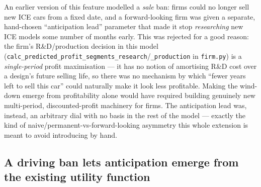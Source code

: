 \documentclass[11pt]{article}
\newcommand{\code}[1]{\texttt{#1}}
\begin{document}
An earlier version of this feature modelled a \emph{sale} ban: firms could
no longer sell new ICE cars from a fixed date, and a forward-looking firm
was given a separate, hand-chosen ``anticipation lead'' parameter that made
it stop \emph{researching} new ICE models some number of months early. This
was rejected for a good reason: the firm's R\&D/production decision in this
model (\code{calc\_predicted\_profit\_segments\_research}/\code{\_production}
in \code{firm.py}) is a \emph{single-period} profit maximisation --- it has
no notion of amortising R\&D cost over a design's future selling life, so
there was no mechanism by which ``fewer years left to sell this car'' could
naturally make it look less profitable. Making the wind-down emerge from
profitability alone would have required building genuinely new multi-period,
discounted-profit machinery for firms. The anticipation lead was, instead,
an arbitrary dial with no basis in the rest of the model --- exactly the
kind of naive/permanent-vs-forward-looking asymmetry this whole extension
is meant to avoid introducing by hand.

\subsection{A driving ban lets anticipation emerge from the existing utility function}
\end{document}
